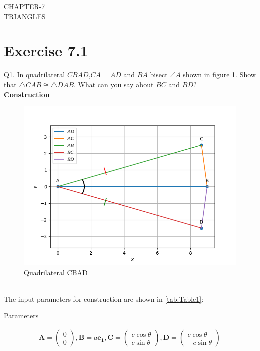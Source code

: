 \documentclass{article}
\newcommand{\myvec}[1]{\ensuremath{\begin{pmatrix}#1\end{pmatrix}}}
\let\vec\mathbf
\begin{document}
\begin{center}
        \textbf\large{CHAPTER-7 \\ TRIANGLES}
\end{center}
\section{Exercise 7.1}
Q1. In quadrilateral $CBAD$,$CA = AD$ and $BA$ bisect $\angle{A}$ shown in figure \ref{fig:Fig1}. Show that $\triangle{CAB} \cong \triangle{DAB}$. What can you say about $BC$ and $BD$? \\
\textbf{Construction}\\
\begin{figure}[h]
	\begin{center}
		\includegraphics[width=\columnwidth]{figs/graph.png}
	\end{center}
	\caption{Quadrilateral CBAD}
	\label{fig:Fig1}
\end{figure}
\pagebreak
\\ The input parameters for construction are shown in \ref{tab:Table1}:\\
\begin{table}[h]
	  \centering
	  
	  \caption{Parameters}
	  \label{tab:Table1}
\end{table}
\begin{align}
	\vec{A} = \myvec{0\\0},\vec{B} = a\vec{e_1},\vec{C} = \myvec{c\cos\theta\\c\sin\theta},\vec{D} = \myvec{c\cos\theta\\-c\sin\theta}
\end{align}
\end{document}
